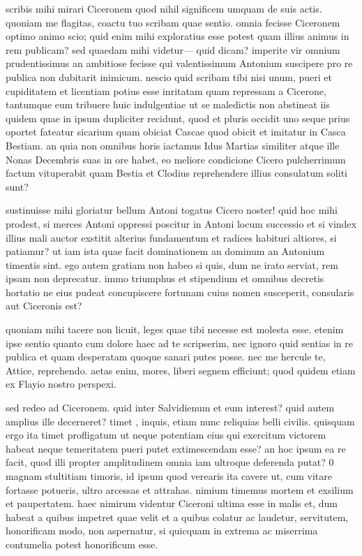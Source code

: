 


 scribis mihi mirari Ciceronem quod nihil significem umquam de suis actis. quoniam me flagitas, coactu tuo scribam quae sentio. omnia fecisse Ciceronem optimo animo scio; quid enim mihi exploratius esse potest quam illius animus in rem publicam? sed quaedam mihi videtur— quid dicam? imperite vir omnium prudentissimus an ambitiose fecisse qui valentissimum Antonium suscipere pro re publica non dubitarit inimicum. nescio quid scribam tibi nisi unum, pueri et cupiditatem et licentiam potius esse inritatam quam repressam a Cicerone, tantumque eum tribuere huic indulgentiae ut se maledictis non abstineat iis quidem quae in ipsum dupliciter recidunt, quod et pluris occidit uno seque prius oportet fateatur sicarium quam obiciat Cascae quod obicit et imitatur in Casca Bestiam. an quia non omnibus horis iactamus Idus Martias similiter atque ille Nonas Decembris suas in ore habet, eo meliore condicione Cicero pulcherrimum factum vituperabit quam Bestia et Clodius reprehendere illius consulatum soliti sunt?

 sustinuisse mihi gloriatur bellum Antoni togatus Cicero noster! quid hoc mihi prodest, si merces Antoni oppressi poscitur in Antoni locum successio et si vindex illius mali auctor exstitit alterius fundamentum et radices habituri altiores, si patiamur? ut iam ista quae facit dominationem an dominum an Antonium timentis sint. ego autem gratiam non habeo si quis, dum ne irato serviat, rem ipsam non deprecatur. immo triumphus et stipendium et omnibus decretis hortatio ne eius pudeat concupiscere fortunam cuius nomen susceperit, consularis aut Ciceronis est?

 quoniam mihi tacere non licuit, leges quae tibi necesse est molesta esse. etenim ipse sentio quanto cum dolore haec ad te scripserim, nec ignoro quid sentias in re publica et quam desperatam quoque sanari putes posse. nec me hercule te, Attice, reprehendo. aetas enim, mores, liberi segnem efficiunt; quod quidem etiam ex Flayio nostro perspexi.

 sed redeo ad Ciceronem. quid inter Salvidienum et eum interest? quid autem amplius ille decerneret? timet , inquis, etiam nunc reliquias belli civilis. quisquam ergo ita timet profligatum ut neque potentiam eius qui exercitum victorem habeat neque temeritatem pueri putet extimescendam esse? an hoc ipsum ea re facit, quod illi propter amplitudinem omnia iam ultroque deferenda putat? 0 magnam stultitiam timoris, id ipsum quod verearis ita cavere ut, cum vitare fortasse potueris, ultro arcessas et attrahas. nimium timemus mortem et exsilium et paupertatem. haec nimirum videntur Ciceroni ultima esse in malis et, dum habeat a quibus impetret quae velit et a quibus colatur ac laudetur, servitutem, honorificam modo, non aspernatur, si quicquam in extrema ac miserrima contumelia potest honorificum esse.

